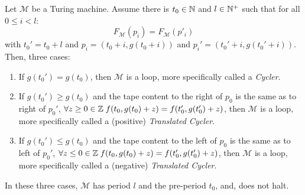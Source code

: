 \begin{theorem}[Loops]\label{th:loops:theory} Let $\mathcal{M}$ be a Turing machine.
    Assume there is $ t_0 \in \mathbb{N}$ and $l \in \mathbb{N}^+$ such that
    for all $0 \leq i < l$: $$F_\mathcal{M}(p_i)   = F_\mathcal{M}(p'_i)$$
    with $t_0' = t_0+l$ and $p_i = (t_0+i, g(t_0+i))$ and $p_i' = (t_0'+i, g(t_0'+i))$. Then, three cases:
    \begin{enumerate}
        \item If $g(t_0') = g(t_0)$, then $\mathcal{M}$ is a loop, more specifically called a \textit{Cycler}.\label{th:case1}
        \item If $g(t_0') \geq g(t_0)$ and the tape content to the right of $p_0$ is the same as to right of $p_0'$, \ie $\forall z \geq 0 \in  \mathbb{Z} \; f(t_0,g(t_0)+z) = f(t_0',g(t_0')+z)$, then $\mathcal{M}$ is a loop, more specifically called a (positive) \textit{Translated Cycler}.\label{th:case2}
        \item If $g(t_0') \leq g(t_0)$ and the tape content to the left of $p_0$ is the same as to left of $p_0'$, \ie $\forall z \leq 0 \in \mathbb{Z} \; f(t_0,g(t_0)+z) = f(t_0',g(t_0')+z)$, then $\mathcal{M}$ is a loop, more specifically called a (negative) \textit{Translated Cycler}.\label{th:case3}
    \end{enumerate}
    In these three cases, $\mathcal{M}$ has period $l$ and the pre-period $t_0$, and, does not halt.
\end{theorem}

